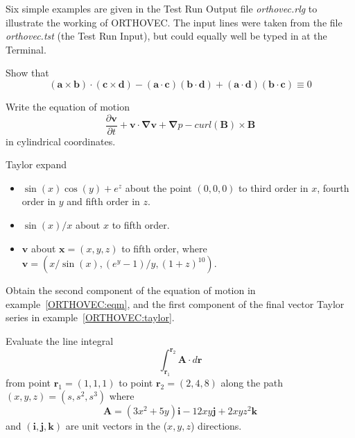 Six  simple examples are given in the Test Run Output file 
\emph{orthovec.rlg} to illustrate the working of \textsc{ORTHOVEC}.  
The input lines were taken from the file
\emph{orthovec.tst} (the Test Run Input), but could 
equally well be typed in at the Terminal.

\example{}

Show that
\begin{equation*}
(\mathbf{a}  \times \mathbf{b}) \cdot (\mathbf{c} \times \mathbf{d}) - (\mathbf{a} 
\cdot \mathbf{c})(\mathbf{b} \cdot \mathbf{d})
 + (\mathbf{a} \cdot \mathbf{d})(\mathbf{b} \cdot \mathbf{c}) \equiv 0
\end{equation*}
 
\example{}\label{ORTHOVEC:eqm}

Write the equation of motion
\begin{equation*}
\frac{\partial \mathbf{v}}{\partial t} + \mathbf{v} \cdot \mathbf{\nabla v} 
+ \mathbf{\nabla} p - curl (\mathbf{B}) \times \mathbf{B}
\end{equation*}
in cylindrical coordinates.

\example{}\label{ORTHOVEC:taylor}

Taylor expand
\begin{itemize}
\item $\sin(x) \cos(y) +e^z$
about the point $(0,0,0)$ to third order in $x$, fourth order in $y$ and
fifth order in $z$.

\item $\sin(x)/x$ about $x$ to fifth order.

\item $\mathbf{v}$ about $\mathbf{x}=(x,y,z)$ to fifth order, where
$\mathbf{v} = (x/ \sin(x),(e^y-1)/y,(1+z)^{10})$.
\end{itemize}

\example{}

Obtain the second component of the equation of motion in
example~\ref{ORTHOVEC:eqm}, and the first component of the final
vector Taylor series in example~\ref{ORTHOVEC:taylor}.

\example{}

Evaluate the line integral 
\begin{equation*}
\int^{\mathbf{r}_2}_{\mathbf{r}_1} \mathbf{A} \cdot d\mathbf{r}
\end{equation*}
from point $\mathbf{r}_1 = (1,1,1)$ to point
$\mathbf{r}_2 = (2,4,8)$ along the path $(x,y,z) = (s, s^2, s^3)$ where
\begin{equation*}
\mathbf{A} = (3x^2 + 5y) \mathbf{i} - 12xy\mathbf{j} + 2xyz^2\mathbf{k}
\end{equation*}
and $(\mathbf{i, j, k})$ are unit vectors in the ($x,y,z$) directions.

